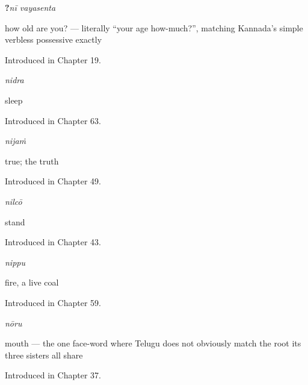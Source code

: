 \noindent\begin{minipage}[t]{\linewidth}
\raggedright
\textbf{ ?}\enspace\emph{nī vayasenta}\par
\small how old are you? — literally \textquotedblleft{}your age how-much?\textquotedblright{}, matching Kannada's simple verbless possessive exactly\par
\footnotesize Introduced in Chapter 19.
\end{minipage}\par\medskip

\noindent\begin{minipage}[t]{\linewidth}
\raggedright
\textbf{}\enspace\emph{nidra}\par
\small sleep\par
\footnotesize Introduced in Chapter 63.
\end{minipage}\par\medskip

\noindent\begin{minipage}[t]{\linewidth}
\raggedright
\textbf{}\enspace\emph{nijaṁ}\par
\small true; the truth\par
\footnotesize Introduced in Chapter 49.
\end{minipage}\par\medskip

\noindent\begin{minipage}[t]{\linewidth}
\raggedright
\textbf{}\enspace\emph{nilcō}\par
\small stand\par
\footnotesize Introduced in Chapter 43.
\end{minipage}\par\medskip

\noindent\begin{minipage}[t]{\linewidth}
\raggedright
\textbf{}\enspace\emph{nippu}\par
\small fire, a live coal\par
\footnotesize Introduced in Chapter 59.
\end{minipage}\par\medskip

\noindent\begin{minipage}[t]{\linewidth}
\raggedright
\textbf{}\enspace\emph{nōru}\par
\small mouth — the one face-word where Telugu does not obviously match the root its three sisters all share\par
\footnotesize Introduced in Chapter 37.
\end{minipage}\par\medskip

